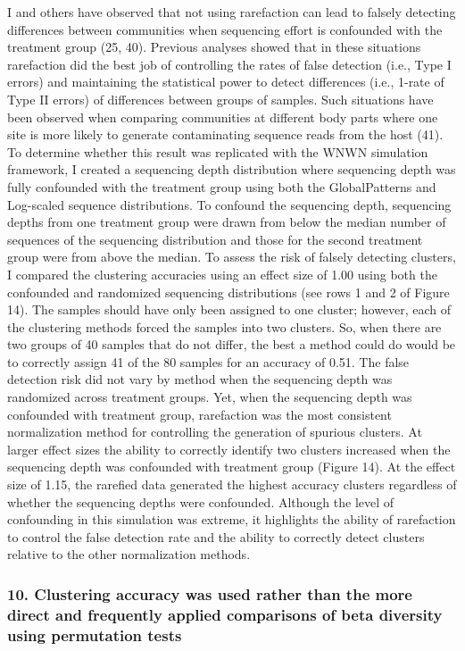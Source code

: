 \documentclass[
]{article}
\begin{document}
I and others have observed that not using rarefaction can lead to
falsely detecting differences between communities when sequencing effort
is confounded with the treatment group (25, 40). Previous analyses
showed that in these situations rarefaction did the best job of
controlling the rates of false detection (i.e., Type I errors) and
maintaining the statistical power to detect differences (i.e., 1-rate of
Type II errors) of differences between groups of samples. Such
situations have been observed when comparing communities at different
body parts where one site is more likely to generate contaminating
sequence reads from the host (41). To determine whether this result was
replicated with the WNWN simulation framework, I created a sequencing
depth distribution where sequencing depth was fully confounded with the
treatment group using both the GlobalPatterns and Log-scaled sequence
distributions. To confound the sequencing depth, sequencing depths from
one treatment group were drawn from below the median number of sequences
of the sequencing distribution and those for the second treatment group
were from above the median. To assess the risk of falsely detecting
clusters, I compared the clustering accuracies using an effect size of
1.00 using both the confounded and randomized sequencing distributions
(see rows 1 and 2 of Figure 14). The samples should have only been
assigned to one cluster; however, each of the clustering methods forced
the samples into two clusters. So, when there are two groups of 40
samples that do not differ, the best a method could do would be to
correctly assign 41 of the 80 samples for an accuracy of 0.51. The false
detection risk did not vary by method when the sequencing depth was
randomized across treatment groups. Yet, when the sequencing depth was
confounded with treatment group, rarefaction was the most consistent
normalization method for controlling the generation of spurious
clusters. At larger effect sizes the ability to correctly identify two
clusters increased when the sequencing depth was confounded with
treatment group (Figure 14). At the effect size of 1.15, the rarefied
data generated the highest accuracy clusters regardless of whether the
sequencing depths were confounded. Although the level of confounding in
this simulation was extreme, it highlights the ability of rarefaction to
control the false detection rate and the ability to correctly detect
clusters relative to the other normalization methods.

\hypertarget{clustering-accuracy-was-used-rather-than-the-more-direct-and-frequently-applied-comparisons-of-beta-diversity-using-permutation-tests}{%
\subsubsection{10. Clustering accuracy was used rather than the more
direct and frequently applied comparisons of beta diversity using
permutation
tests}\label{clustering-accuracy-was-used-rather-than-the-more-direct-and-frequently-applied-comparisons-of-beta-diversity-using-permutation-tests}}
\end{document}
